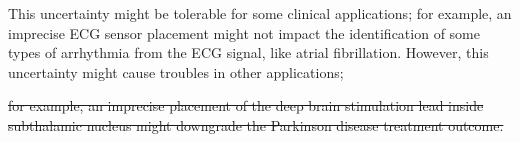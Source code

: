 {This uncertainty might be tolerable for some clinical applications;
for example, an imprecise ECG sensor placement might not impact the
identification of some types of arrhythmia from the ECG signal, like
atrial fibrillation. However, this uncertainty might cause troubles in
other applications;


\st{for example, an imprecise placement of the deep brain stimulation
      lead inside subthalamic nucleus might downgrade the Parkinson
      disease treatment outcome.}


}
